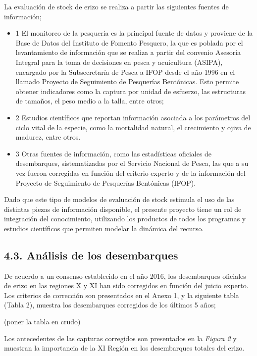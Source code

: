 \documentclass[
]{article}
\begin{document}
La evaluación de stock de erizo se realiza a partir las siguientes
fuentes de información;

\begin{itemize}
\item
  1 El monitoreo de la pesquería es la principal fuente de datos y
  proviene de la Base de Datos del Instituto de Fomento Pesquero, la que
  es poblada por el levantamiento de información que se realiza a partir
  del convenio Asesoría Integral para la toma de decisiones en pesca y
  acuicultura (ASIPA), encargado por la Subsecretaría de Pesca a IFOP
  desde el año 1996 en el llamado Proyecto de Seguimiento de Pesquerías
  Bentónicas. Esto permite obtener indicadores como la captura por
  unidad de esfuerzo, las estructuras de tamaños, el peso medio a la
  talla, entre otros;
\item
  2 Estudios científicos que reportan información asociada a los
  parámetros del ciclo vital de la especie, como la mortalidad natural,
  el crecimiento y ojiva de madurez, entre otros.
\item
  3 Otras fuentes de información, como las estadísticas oficiales de
  desembarques, sistematizadas por el Servicio Nacional de Pesca, las
  que a su vez fueron corregidas en función del criterio experto y de la
  información del Proyecto de Seguimiento de Pesquerías Bentónicas
  (IFOP).
\end{itemize}

Dado que este tipo de modelos de evaluación de stock estimula el uso de
las distintas piezas de información disponible, el presente proyecto
tiene un rol de integración del conocimiento, utilizando los productos
de todos los programas y estudios científicos que permiten modelar la
dinámica del recurso.

\hypertarget{anuxe1lisis-de-los-desembarques}{%
\subsection{4.3. Análisis de los
desembarques}\label{anuxe1lisis-de-los-desembarques}}

De acuerdo a un consenso establecido en el año 2016, los desembarques
oficiales de erizo en las regiones X y XI han sido corregidos en función
del juicio experto. Los criterios de corrección son presentados en el
Anexo 1, y la siguiente tabla (Tabla 2), muestra los desembarques
corregidos de los últimos 5 años;

(poner la tabla en crudo)

Los antecedentes de las capturas corregidos son presentados en la
\emph{Figura 2} y muestran la importancia de la XI Región en los
desembarques totales del erizo.
\end{document}
